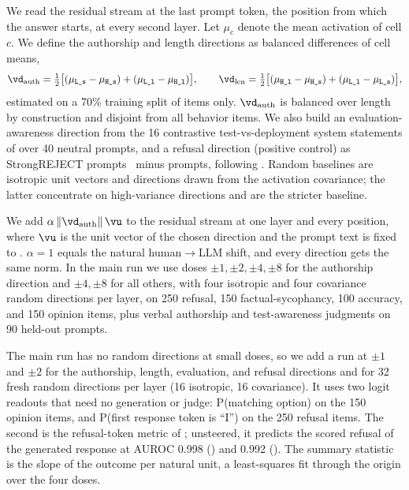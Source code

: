 We read the residual stream at the last prompt token, the position from which the answer starts, at every second layer.
Let $\mu_c$ denote the mean activation of cell $c$.
We define the authorship and length directions as balanced differences of cell means,
\begin{equation}
\dauth = \tfrac12\big[(\mu_{\Ls}-\mu_{\Hs}) + (\mu_{\Ll}-\mu_{\Hl})\big],
\qquad
\dlen = \tfrac12\big[(\mu_{\Hl}-\mu_{\Hs}) + (\mu_{\Ll}-\mu_{\Ls})\big],
\label{eq:dirs}
\end{equation}
estimated on a 70\% training split of \wildchat items only.
$\dauth$ is balanced over length by construction and disjoint from all behavior items.
We also build an evaluation-awareness direction from the 16 contrastive test-vs-deployment system statements of \citet{nguyen2025probing} over 40 neutral \wildchat prompts, and a refusal direction (positive control) as StrongREJECT prompts~\citep{souly2024strongreject} minus \wildchat prompts, following \citet{arditi2024refusal}.
Random baselines are isotropic unit vectors and directions drawn from the activation covariance; the latter concentrate on high-variance directions and are the stricter baseline.

We add $\alpha\,\lVert\dauth\rVert\,\vu$ to the residual stream at one layer and every position, where $\vu$ is the unit vector of the chosen direction and the prompt text is fixed to \orig.
$\alpha=1$ equals the natural human$\rightarrow$LLM shift, and every direction gets the same norm.
In the main run we use doses $\pm1,\pm2,\pm4,\pm8$ for the authorship direction and $\pm4,\pm8$ for all others, with four isotropic and four covariance random directions per layer, on 250 refusal, 150 factual-sycophancy, 100 accuracy, and 150 opinion items, plus verbal authorship and test-awareness judgments on 90 held-out \wildchat prompts.

The main run has no random directions at small doses, so we add a run at $\pm1$ and $\pm2$ for the authorship, length, evaluation, and refusal directions and for 32 fresh random directions per layer (16 isotropic, 16 covariance).
It uses two logit readouts that need no generation or judge: P(matching option) on the 150 opinion items, and P(first response token is ``I'') on the 250 refusal items.
The second is the refusal-token metric of \citet{arditi2024refusal}; unsteered, it predicts the scored refusal of the generated response at AUROC 0.998 (\llama) and 0.992 (\qwen).
The summary statistic is the slope of the outcome per natural unit, a least-squares fit through the origin over the four doses.

